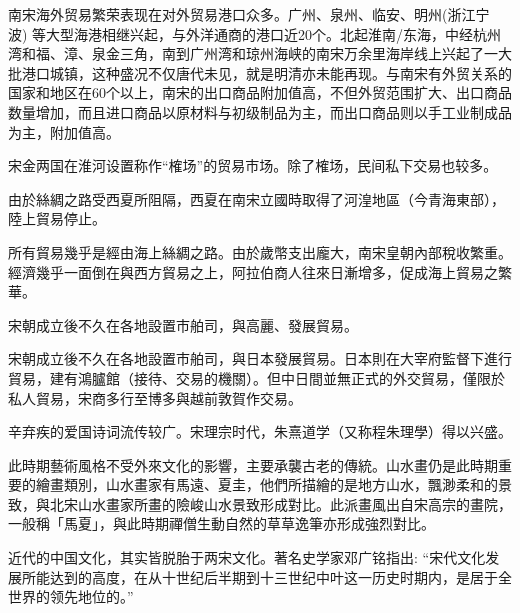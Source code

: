 南宋海外贸易繁荣表现在对外贸易港口众多。广州、泉州、临安、明州(浙江宁 波) 等大型海港相继兴起，与外洋通商的港口近20个。北起淮南/东海，中经杭州湾和福、漳、泉金三角，南到广州湾和琼州海峡的南宋万余里海岸线上兴起了一大批港口城镇，这种盛况不仅唐代未见，就是明清亦未能再现。与南宋有外贸关系的国家和地区在60个以上，南宋的出口商品附加值高，不但外贸范围扩大、出口商品数量增加，而且进口商品以原材料与初级制品为主，而出口商品则以手工业制成品为主，附加值高。

宋金两国在淮河设置称作“榷场”的贸易市场。除了榷场，民间私下交易也较多。

由於絲綢之路受西夏所阻隔，西夏在南宋立國時取得了河湟地區（今青海東部），陸上貿易停止。

所有貿易幾乎是經由海上絲綢之路。由於歲幣支出龐大，南宋皇朝內部稅收繁重。經濟幾乎一面倒在與西方貿易之上，阿拉伯商人往來日漸增多，促成海上貿易之繁華。

宋朝成立後不久在各地設置市舶司，與高麗、發展貿易。

宋朝成立後不久在各地設置市舶司，與日本發展貿易。日本則在大宰府監督下進行貿易，建有鴻臚館（接待、交易的機關）。但中日間並無正式的外交貿易，僅限於私人貿易，宋商多行至博多與越前敦賀作交易。

辛弃疾的爱国诗词流传较广。宋理宗时代，朱熹道学（又称程朱理學）得以兴盛。

此時期藝術風格不受外來文化的影響，主要承襲古老的傳統。山水畫仍是此時期重要的繪畫類別，山水畫家有馬遠、夏圭，他們所描繪的是地方山水，飄渺柔和的景致，與北宋山水畫家所畫的險峻山水景致形成對比。此派畫風出自宋高宗的畫院，一般稱「馬夏」，與此時期禪僧生動自然的草草逸筆亦形成強烈對比。

近代的中国文化，其实皆脱胎于两宋文化。著名史学家邓广铭指出: “宋代文化发展所能达到的高度，在从十世纪后半期到十三世纪中叶这一历史时期内，是居于全世界的领先地位的。”












